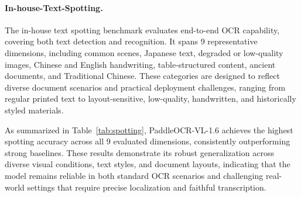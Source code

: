 \documentclass[11pt, a4paper,logo,  copyright, nonumbering]{paddleocr}
\begin{document}
\paragraph{In-house-Text-Spotting.}
The in-house text spotting benchmark evaluates end-to-end OCR capability, covering both text detection and recognition. It spans 9 representative dimensions, including common scenes, Japanese text, degraded or low-quality images, Chinese and English handwriting, table-structured content, ancient documents, and Traditional Chinese. These categories are designed to reflect diverse document scenarios and practical deployment challenges, ranging from regular printed text to layout-sensitive, low-quality, handwritten, and historically styled materials.

As summarized in Table~\ref{tab:spotting}, PaddleOCR-VL-1.6 achieves the highest spotting accuracy across all 9 evaluated dimensions, consistently outperforming strong baselines. These results demonstrate its robust generalization across diverse visual conditions, text styles, and document layouts, indicating that the model remains reliable in both standard OCR scenarios and challenging real-world settings that require precise localization and faithful transcription.
\end{document}
